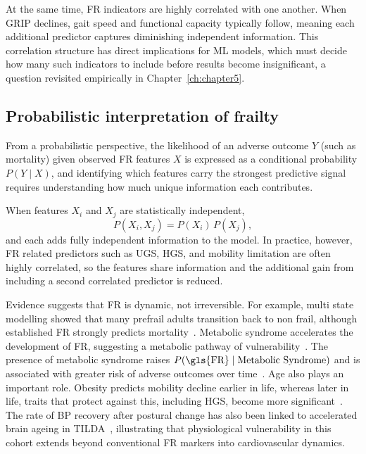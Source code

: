 At the same time, \gls{FR} indicators are highly correlated with one another. When \gls{GRIP} declines, gait speed and functional capacity typically follow, meaning each additional predictor captures diminishing independent information. This correlation structure has direct implications for \gls{ML} models, which must decide how many such indicators to include before results become insignificant, a question revisited empirically in Chapter~\ref{ch:chapter5}.

\subsection{Probabilistic interpretation of frailty}
From a probabilistic perspective, the likelihood of an adverse outcome $Y$ (such as mortality) given observed \gls{FR} features $X$ is expressed as a conditional probability $P(Y \mid X)$, and identifying which features carry the strongest predictive signal requires understanding how much unique information each contributes. 

When features $X_i$ and $X_j$ are statistically independent,
\begin{equation*}
P(X_i, X_j) = P(X_i)\,P(X_j),
\end{equation*}
and each adds fully independent information to the model. In practice, however, \gls{FR} related predictors such as \gls{UGS}, \gls{HGS}, and mobility limitation are often highly correlated, so the features share information and the additional gain from including a second correlated predictor is reduced.

Evidence suggests that \gls{FR} is dynamic, not irreversible. 
For example, multi state modelling showed that many prefrail adults transition back to non frail, although established \gls{FR} strongly predicts mortality~\cite{romero-ortunoTransitionsFrailtyPhenotype2021}. 
Metabolic syndrome accelerates the development of \gls{FR}, suggesting a metabolic pathway of vulnerability~\cite{mccarthyAssociationMetabolicSyndrome2023}. 
The presence of metabolic syndrome raises $P(\text{\gls{FR}} \mid \text{Metabolic Syndrome})$ and is associated with greater risk of adverse outcomes over time~\cite{mccarthyAssociationMetabolicSyndrome2023}. 
Age also plays an important role. Obesity predicts mobility decline earlier in life,  whereas later in life, traits that protect against this, including \gls{HGS}, become more significant~\cite{huangAgeModifyAssociations2019}. The rate of \gls{BP} recovery after postural change has also been linked to accelerated brain ageing in \gls{TILDA}~\cite{a.shirsathSlowerSpeedBlood2024}, illustrating that physiological vulnerability in this cohort extends beyond conventional \gls{FR} markers into cardiovascular dynamics.

